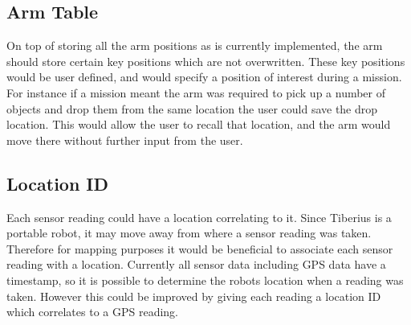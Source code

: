 \subsection{Arm Table}
On top of storing all the arm positions as is currently implemented, the arm should store certain key positions which are not overwritten. These key positions would be user defined, and would specify a position of interest during a mission. For instance if a mission meant the arm was required to pick up a number of objects and drop them from the same location the user could save the drop location. This would allow the user to recall that location, and the arm would move there without further input from the user.

\subsection{Location ID}
Each sensor reading could have a location correlating to it. Since Tiberius is a portable robot, it may move away from where a sensor reading was taken. Therefore for mapping purposes it would be beneficial to associate each sensor reading with a location.
\newline
Currently all sensor data including GPS data have a timestamp, so it is possible to determine the robots location when a reading was taken. However this could be improved by giving each reading a location ID which correlates to a GPS reading. 





